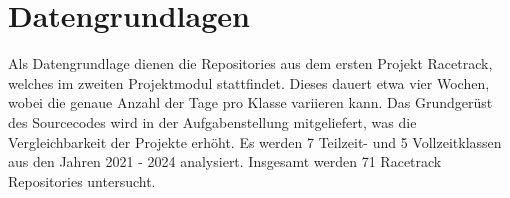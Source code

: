 \section{Datengrundlagen}
\label{sec:Datengrundlagen}
Als Datengrundlage dienen die Repositories aus dem ersten Projekt Racetrack, welches im zweiten Projektmodul stattfindet. Dieses dauert etwa vier Wochen, wobei die genaue Anzahl der Tage pro Klasse variieren kann. Das Grundgerüst des Sourcecodes wird in der Aufgabenstellung mitgeliefert, was die Vergleichbarkeit der Projekte erhöht. Es werden 7 Teilzeit- und 5 Vollzeitklassen aus den Jahren 2021 - 2024 analysiert. Insgesamt werden 71 Racetrack Repositories untersucht. 


